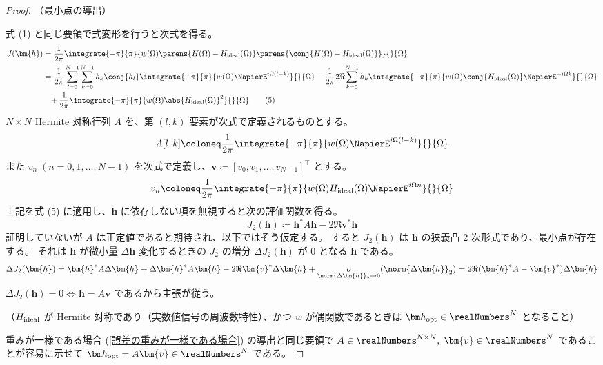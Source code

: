             \begin{proof}
                \quad\par\noindent
                （最小点の導出）
                \par
                式 (1) と同じ要領で式変形を行うと次式を得る。
                \begin{align*}
                    J(\bm{h}) &= \frac{1}{2\pi}\integrate{-\pi}{\pi}{w(\Omega)\parens{H(\Omega)-\Hideal(\Omega)}\parens{\conj{H(\Omega)-\Hideal(\Omega)}}}{}{\Omega} \\
                    &= \frac{1}{2\pi}\sum_{l=0}^{N-1}\sum_{k=0}^{N-1}h_k\conj{h_l}\integrate{-\pi}{\pi}{w(\Omega)\NapierE^{i\Omega(l-k)}}{}{\Omega} - \frac{1}{2\pi}2\Re{\sum_{k=0}^{N-1}h_k\integrate{-\pi}{\pi}{w(\Omega)\conj{\Hideal(\Omega)}\NapierE^{-i\Omega k}}{}{\Omega}} \\
                    &\phantom{=} + \frac{1}{2\pi}\integrate{-\pi}{\pi}{w(\Omega)\abs{\Hideal(\Omega)}^2}{}{\Omega}\tag{5}
                \end{align*}
                $N\times N$ Hermite 対称行列 $A$ を、第 $(l,k)$ 要素が次式で定義されるものとする。
                \[ A[l,k] \coloneq \frac{1}{2\pi}\integrate{-\pi}{\pi}{w(\Omega)\NapierE^{i\Omega(l-k)}}{}{\Omega} \]
                また $v_n\;(n=0,1,\dots,N-1)$ を次式で定義し、$\bm{v}\coloneq[v_0,v_1,\dots,v_{N-1}]^\top$ とする。
                \[ v_n \coloneq \frac{1}{2\pi}\integrate{-\pi}{\pi}{w(\Omega)\Hideal(\Omega)\NapierE^{i\Omega n}}{}{\Omega} \]
                上記を式 (5) に適用し、$\bm{h}$ に依存しない項を無視すると次の評価関数を得る。
                \[ J_2(\bm{h}) \coloneq \bm{h}^*A\bm{h} - 2\Re{\bm{v}^*\bm{h}} \]
                証明していないが $A$ は正定値であると期待され、以下ではそう仮定する。
                すると $J_2(\bm{h})$ は $\bm{h}$ の狭義凸 2 次形式であり、最小点が存在する。
                それは $\bm{h}$ が微小量 $\Delta\bm{h}$ 変化するときの $J_2$ の増分 $\Delta J_2(\bm{h})$ が 0 となる $\bm{h}$ である。
                \[ \Delta J_2(\bm{h}) = \bm{h}^*A\Delta\bm{h} + \Delta\bm{h}^*A\bm{h} - 2\Re{\bm{v}^*\Delta\bm{h}} + \underset{\norm{\Delta\bm{h}}_2\to 0}{o}(\norm{\Delta\bm{h}}_2) = 2\Re{(\bm{h}^*A-\bm{v}^*)\Delta\bm{h}} \]
                $\Delta J_2(\bm{h}) = 0\iff\bm{h} = A\bm{v}$ であるから主張が従う。
                \newline
                \par\noindent
                （$H_\text{ideal}$ が Hermite 対称であり（実数値信号の周波数特性）、かつ $w$ が偶関数であるときは $\vhOpt\in\realNumbers^N$ となること）
                \par
                重みが一様である場合 (\cref{誤差の重みが一様である場合}) の導出と同じ要領で $A\in\realNumbers^{N\times N},\;\bm{v}\in\realNumbers^N$ であることが容易に示せて $\vhOpt=A\bm{v}\in\realNumbers^N$ である。
            \end{proof}
